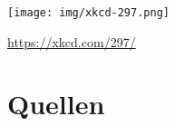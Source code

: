 \begin{frame}{}
	\begin{center} \small
		\texttt{[image: img/xkcd-297.png]}
		
		\url{https://xkcd.com/297/}
	\end{center}
\end{frame}

\nocite{*}
\section*{Quellen}
\begin{frame}[allowframebreaks,t]{\secname}
	\printbibliography
\end{frame}